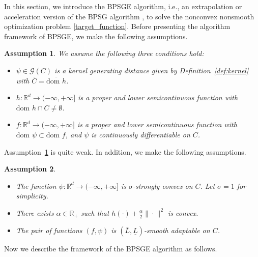 \documentclass[letterpaper]{article} %
\newtheorem{assumption}{Assumption}
\begin{document}
	In this section, we introduce the BPSGE algorithm, i.e., an extrapolation or acceleration version of the BPSG algorithm \cite{WangH23},   to solve the nonconvex nonsmooth optimization problem \eqref{target_function}.  
	Before presenting the algorithm framework of BPSGE, we make the following assumptions.
	\begin{assumption} \label{assume_01}
		We assume   the following three conditions hold:
		\begin{itemize}
			\item $\psi\in\mathcal{G}(C)$ is a kernel generating distance given by Definition~\ref{def:kernel} with $\overline{C}=\overline{\text{dom }h}$.
			\item $h:\mathbb{R}^{d}\rightarrow(-\infty,+\infty]$ is a proper and lower semicontinuous function with $\text{dom }h\cap C\neq\emptyset$.
			\item $f:\mathbb{R}^{d}\rightarrow(-\infty,+\infty]$ is a proper and lower semicontinuous function with $\text{dom }\psi\subset\text{dom }f$, and  $\psi$ is continuously differentiable on $C$.
		\end{itemize}
	\end{assumption}
	Assumption~\ref{assume_01} is quite weak. In addition, we make the following assumptions.
	\begin{assumption}\label{assume_02}
		\begin{itemize}
			\item The function $\psi:\mathbb{R}^{d}\rightarrow(-\infty,+\infty]$ is $\sigma$-strongly convex on $C$. Let $\sigma=1$ for simplicity.
			\item There exists $\alpha\in\mathbb{R}_{+}$ such that $h(\cdot)+\frac{\alpha}{2}\|\cdot\|^{2}$ is convex.
			\item The pair of functions $(f,\psi)$ is $(\bar{L},\underline{L})$-smooth adaptable on $C$. 
		\end{itemize}
	\end{assumption} 
	
	Now we describe the framework of the BPSGE algorithm as follows.
	
\end{document}
